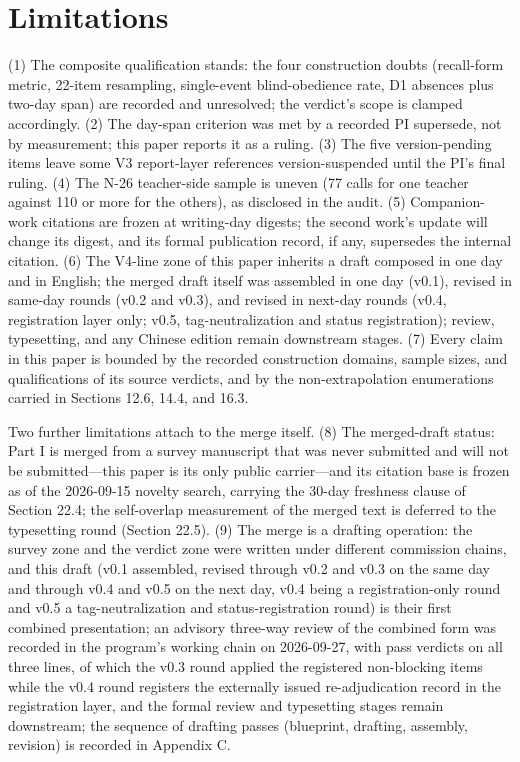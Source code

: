 \documentclass[11pt]{article}
\begin{document}
\section{Limitations}
\label{sec:21}
\noindent (1) The composite qualification stands: the four construction doubts (recall-form metric, 22-item resampling, single-event blind-obedience rate, D1 absences plus two-day span) are recorded and unresolved; the verdict's scope is clamped accordingly. (2) The day-span criterion was met by a recorded PI supersede, not by measurement; this paper reports it as a ruling. (3) The five version-pending items leave some V3 report-layer references version-suspended until the PI's final ruling. (4) The N-26 teacher-side sample is uneven (77 calls for one teacher against 110 or more for the others), as disclosed in the audit. (5) Companion-work citations are frozen at writing-day digests; the second work's update will change its digest, and its formal publication record, if any, supersedes the internal citation. (6) The V4-line zone of this paper inherits a draft composed in one day and in English; the merged draft itself was assembled in one day (v0.1), revised in same-day rounds (v0.2 and v0.3), and revised in next-day rounds (v0.4, registration layer only; v0.5, tag-neutralization and status registration); review, typesetting, and any Chinese edition remain downstream stages. (7) Every claim in this paper is bounded by the recorded construction domains, sample sizes, and qualifications of its source verdicts, and by the non-extrapolation enumerations carried in Sections 12.6, 14.4, and 16.3.\par
\noindent Two further limitations attach to the merge itself. (8) The merged-draft status: Part I is merged from a survey manuscript that was never submitted and will not be submitted—this paper is its only public carrier—and its citation base is frozen as of the 2026-09-15 novelty search, carrying the 30-day freshness clause of Section 22.4; the self-overlap measurement of the merged text is deferred to the typesetting round (Section 22.5). (9) The merge is a drafting operation: the survey zone and the verdict zone were written under different commission chains, and this draft (v0.1 assembled, revised through v0.2 and v0.3 on the same day and through v0.4 and v0.5 on the next day, v0.4 being a registration-only round and v0.5 a tag-neutralization and status-registration round) is their first combined presentation; an advisory three-way review of the combined form was recorded in the program's working chain on 2026-09-27, with pass verdicts on all three lines, of which the v0.3 round applied the registered non-blocking items while the v0.4 round registers the externally issued re-adjudication record in the registration layer, and the formal review and typesetting stages remain downstream; the sequence of drafting passes (blueprint, drafting, assembly, revision) is recorded in Appendix C.\par
\end{document}
